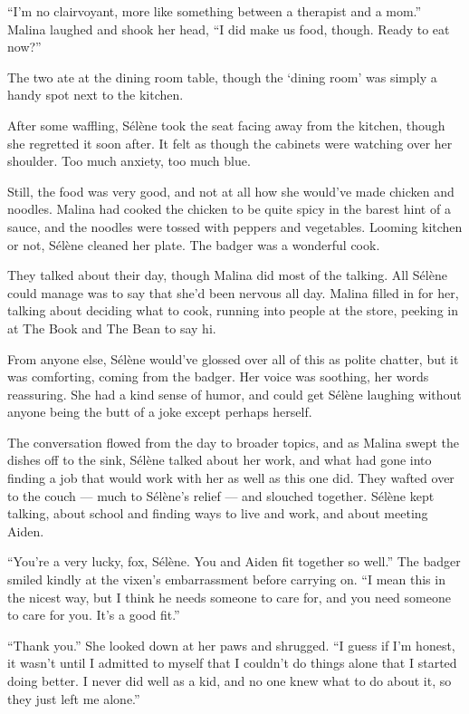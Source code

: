 ``I'm no clairvoyant, more like something between a therapist and a mom.'' Malina laughed and shook her head, ``I did make us food, though. Ready to eat now?''

The two ate at the dining room table, though the `dining room' was simply a handy spot next to the kitchen.

After some waffling, Sélène took the seat facing away from the kitchen, though she regretted it soon after. It felt as though the cabinets were watching over her shoulder. Too much anxiety, too much blue.

Still, the food was very good, and not at all how she would've made chicken and noodles. Malina had cooked the chicken to be quite spicy in the barest hint of a sauce, and the noodles were tossed with peppers and vegetables. Looming kitchen or not, Sélène cleaned her plate. The badger was a wonderful cook.

They talked about their day, though Malina did most of the talking. All Sélène could manage was to say that she'd been nervous all day. Malina filled in for her, talking about deciding what to cook, running into people at the store, peeking in at The Book and The Bean to say hi.

From anyone else, Sélène would've glossed over all of this as polite chatter, but it was comforting, coming from the badger. Her voice was soothing, her words reassuring. She had a kind sense of humor, and could get Sélène laughing without anyone being the butt of a joke except perhaps herself.

The conversation flowed from the day to broader topics, and as Malina swept the dishes off to the sink, Sélène talked about her work, and what had gone into finding a job that would work with her as well as this one did. They wafted over to the couch --- much to Sélène's relief --- and slouched together. Sélène kept talking, about school and finding ways to live and work, and about meeting Aiden.

``You're a very lucky, fox, Sélène. You and Aiden fit together so well.'' The badger smiled kindly at the vixen's embarrassment before carrying on. ``I mean this in the nicest way, but I think he needs someone to care for, and you need someone to care for you. It's a good fit.''

``Thank you.'' She looked down at her paws and shrugged. ``I guess if I'm honest, it wasn't until I admitted to myself that I couldn't do things alone that I started doing better. I never did well as a kid, and no one knew what to do about it, so they just left me alone.''

